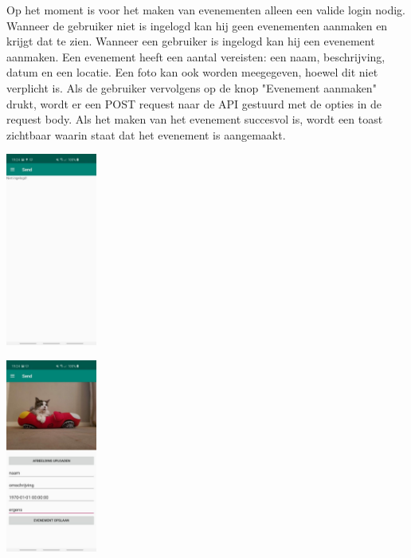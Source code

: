 \documentclass[dutch]{report}
\begin{document}
	Op het moment is voor het maken van evenementen alleen een valide login nodig. Wanneer de gebruiker niet is ingelogd kan hij geen evenementen aanmaken en krijgt dat te zien. 
	Wanneer een gebruiker is ingelogd kan hij een evenement aanmaken. Een evenement heeft een aantal vereisten: een naam, beschrijving, datum en een locatie. Een foto kan ook worden meegegeven,
	hoewel dit niet verplicht is.  Als de gebruiker vervolgens op de knop "Evenement aanmaken" drukt, wordt er een POST request naar de API gestuurd met de opties in de 
	request body. Als het maken van het evenement succesvol is, wordt een toast zichtbaar waarin staat dat het evenement is aangemaakt. 
	
	\begin{minipage}{0.33\textwidth}
		\begin{center}
			\includegraphics[width=3cm]{images/FOTOKANGEENEVENTMAKEN.jpg}		
		\end{center}
	\end{minipage}
	\begin{minipage}{0.34\textwidth}
		\begin{center}
			\includegraphics[width=3cm]{images/FOTOINGEVULDEVENT.jpg}
		\end{center}
	\end{minipage}
\end{document}
